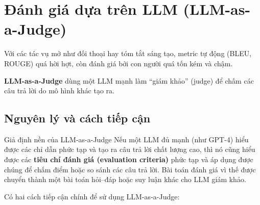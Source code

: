 
\section{Đánh giá dựa trên LLM (LLM-as-a-Judge)}
\label{sec:llm_as_a_judge}

Với các tác vụ mở như đối thoại hay tóm tắt sáng tạo, metric tự động (BLEU, ROUGE) quá hời hợt, còn đánh giá bởi con người quá tốn kém và chậm.

\textbf{LLM-as-a-Judge} dùng một LLM mạnh làm “giám khảo” (judge) để chấm các câu trả lời do mô hình khác tạo ra.

\subsection{Nguyên lý và cách tiếp cận}
\label{ssec:llm_judge_principles}

\begin{keyidea}{Giả định nền của LLM-as-a-Judge}
Nếu một LLM đủ mạnh (như GPT-4) hiểu được các chỉ dẫn phức tạp và tạo ra câu trả lời chất lượng cao, thì nó cũng hiểu được các \textbf{tiêu chí đánh giá (evaluation criteria)} phức tạp và áp dụng được chúng để chấm điểm hoặc so sánh các câu trả lời. Bài toán đánh giá vì thế được chuyển thành một bài toán hỏi--đáp hoặc suy luận khác cho LLM giám khảo.
\end{keyidea}

Có hai cách tiếp cận chính để sử dụng LLM-as-a-Judge:

